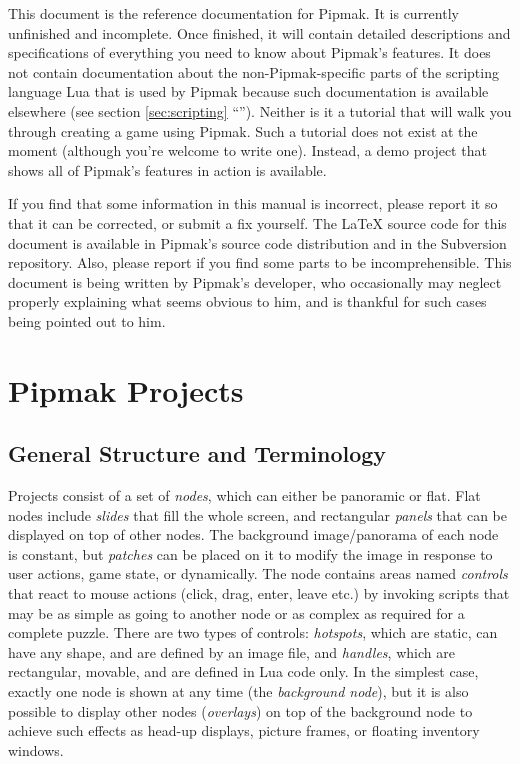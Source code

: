 \documentclass[
	a4paper,
	pagesize,
	10pt,
	oneside,
	idxtotoc,
	bibtotoc,
	BCOR10mm,
	DIV10
]{scrartcl} %
\newcommand{\emphindexed}[1]{\emph{#1}\index{#1}}
\newcommand{\secref}[1]{\ref{sec:#1} “\nameref{sec:#1}”}
\begin{document}
This document is the reference documentation for Pipmak. It is currently unfinished and incomplete. Once finished, it will contain detailed descriptions and specifications of everything you need to know about Pipmak's features. It does not contain documentation about the non-Pipmak-specific parts of the scripting language Lua that is used by Pipmak because such documentation is available elsewhere (see section \secref{scripting}). Neither is it a tutorial that will walk you through creating a game using Pipmak. Such a tutorial does not exist at the moment (although you're welcome to write one). Instead, a demo project that shows all of Pipmak's features in action is available.

If you find that some information in this manual is incorrect, please report it so that it can be corrected, or submit a fix yourself. The \LaTeX{} source code for this document is available in Pipmak's source code distribution and in the Subversion repository. Also, please report if you find some parts to be incomprehensible. This document is being written by Pipmak's developer, who occasionally may neglect properly explaining what seems obvious to him, and is thankful for such cases being pointed out to him.

\section{Pipmak Projects}
\label{sec:projects}

\subsection{General Structure and Terminology}
Projects consist of a set of \emph{nodes}, which can either be panoramic or flat. Flat nodes include \emph{slides} that fill the whole screen, and rectangular \emph{panels} that can be displayed on top of other nodes. The background image/panorama of each node is constant, but \emph{patches} can be placed on it to modify the image in response to user actions, game state, or dynamically. The node contains areas named \emph{controls} that react to mouse actions (click, drag, enter, leave etc.) by invoking scripts that may be as simple as going to another node or as complex as required for a complete puzzle. There are two types of controls: \emph{hotspots}, which are static, can have any shape, and are defined by an image file, and \emph{handles}, which are rectangular, movable, and are defined in Lua code only. In the simplest case, exactly one node is shown at any time (the \emphindexed{background node}), but it is also possible to display other nodes (\emph{overlays}) on top of the background node to achieve such effects as head-up displays, picture frames, or floating inventory windows.
\end{document}
